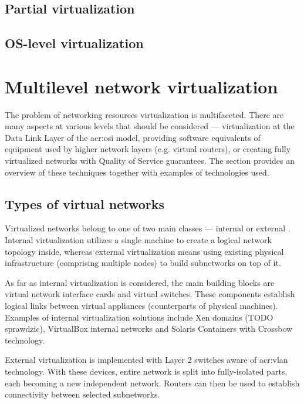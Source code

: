\documentclass[11pt]{book}
\begin{document}
      \subsection{Partial virtualization}

      \subsection{OS-level virtualization}


    \section{Multilevel network virtualization}

      The problem of networking resources virtualization is multifaceted. There are many aspects at various levels that
      should be considered --- virtualization at the Data Link Layer of the \gls{acr:osi} model, providing software
      equivalents of equipment used by higher network layers (e.g. virtual routers), or creating fully virtualized
      networks with Quality of Service guarantees. The section provides an overview of these techniques together with
      examples of technologies used.


      \subsection{Types of virtual networks}

        Virtualized networks belong to one of two main classes --- internal or external \cite{nsag}. Internal
        virtualization utilizes a single machine to create a logical network topology inside, whereas external
        virtualization means using existing physical infrastructure (comprising multiple nodes) to build subnetworks on
        top of it.

        As far as internal virtualization is considered, the main building blocks are virtual network interface cards
        and virtual switches. These components establish logical links between virtual appliances (counterparts of
        physical machines). Examples of internal virtualization solutions include Xen domains (TODO sprawdzic),
        VirtualBox internal networks \cite{vboxum} and Solaris Containers with Crossbow technology.

        External virtualization is implemented with Layer 2 switches aware of \gls{acr:vlan} technology. With these
        devices, entire network is split into fully-isolated parts, each becoming a new independent network. Routers can
        then be used to establish connectivity between selected subnetworks.
\end{document}
